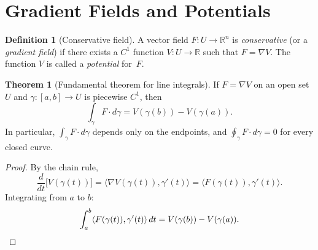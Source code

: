 \documentclass[12pt,a4paper]{book}
\theoremstyle{definition}
\newtheorem{definition}{Definition}[chapter]
\newtheorem{theorem}{Theorem}[chapter]
\begin{document}
\begin{center}
\label{fig:force-field-curve}
\end{center}

\section{Gradient Fields and Potentials}
\label{sec:gradient-fields}

\begin{definition}[Conservative field]\label{def:conservative-field}
A vector field $F\colon U\to\mathbb{R}^n$ is \emph{conservative} (or a
\emph{gradient field}) if there exists a $C^1$ function
$V\colon U\to\mathbb{R}$ such that $F=\nabla V$.  The function $V$ is called
a \emph{potential} for~$F$.
\end{definition}

\begin{theorem}[Fundamental theorem for line integrals]
\label{thm:ftli}
If $F=\nabla V$ on an open set $U$ and $\gamma\colon[a,b]\to U$ is
piecewise $C^1$, then
\[
  \int_\gamma F\cdot d\gamma = V(\gamma(b))-V(\gamma(a)).
\]
In particular, $\int_\gamma F\cdot d\gamma$ depends only on the endpoints,
and $\oint_\gamma F\cdot d\gamma=0$ for every closed curve.
\end{theorem}

\begin{proof}
By the chain rule,
\[
  \frac{d}{dt}\bigl[V(\gamma(t))\bigr]
  = \langle\nabla V(\gamma(t)),\gamma'(t)\rangle
  = \langle F(\gamma(t)),\gamma'(t)\rangle.
\]
Integrating from $a$ to $b$:
\[
  \int_a^b \langle F(\gamma(t)),\gamma'(t)\rangle\,dt
  = V(\gamma(b))-V(\gamma(a)).  \qedhere
\]
\end{proof}
\end{document}
